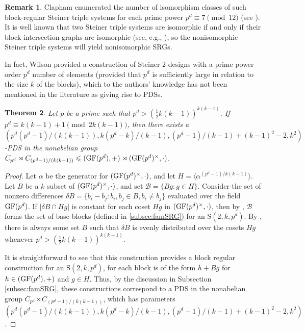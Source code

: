 \documentclass[12pt]{amsproc} %
\newtheorem{thm}{Theorem}[section]
\theoremstyle{definition}\newtheorem{defn}[thm]{Definition}
\theoremstyle{definition}\newtheorem{rem}[thm]{Remark}
\theoremstyle{definition}\newtheorem{ex}[thm]{Example}
\newcommand{\GF}{{\rm GF}}
\renewcommand\le{\leqslant}
\renewcommand{\S}{{\mathrm S}}
\begin{document}
\begin{rem}
 Clapham enumerated the number of isomorphism classes of such block-regular Steiner triple systems for each prime power $p^d \equiv 7 \pmod {12}$ (see \cite[Theorem 4.7]{clapham}). It is well known that two Steiner triple systems are isomorphic if and only if their block-intersection graphs are isomorphic (see, e.g., \cite{Colbourn_Rosa_1999, Pike_1999}), so the nonisomorphic Steiner triple systems will yield nonisomorphic SRGs.
\end{rem}

In fact, Wilson \cite{wilson} provided a construction of Steiner 2-designs with a prime power order $p^d$ number of elements (provided that $p^d$ is sufficiently large in relation to the size $k$ of the blocks), which to the authors' knowledge has not been mentioned in the literature as giving rise to PDSs.

\begin{thm}\label{WilsonBuratti-PDS-family}
Let $p$ be a prime such that $p^d > (\frac12k(k-1))^{k(k-1)}$. If $p^d \equiv k(k-1) + 1 \pmod{2k(k-1)}$, then there exists a $(p^d(p^d - 1)/(k(k-1)), k(p^d-k)/(k-1), (p^d -1)/(k-1) + (k-1)^2 -2, k^2)$-PDS in the nonabelian group $C_{p^d} \rtimes C_{(p^d-1)/(k(k-1))} \le (\GF(p^d), +) \rtimes (\GF(p^d)^\times, \cdot)$.
\end{thm}
	\begin{proof}
	Let $\alpha$ be the generator for $(\GF(p^d)^\times, \cdot)$, and let $H = \langle \alpha^{(p^d-1)/k(k-1)} \rangle$. Let $B$ be a $k$ subset of $(\GF(p^d)^\times, \cdot)$, and set $\mathscr{B} = \{ Bg : g \in H\}$. Consider the set of nonzero differences $\delta B = \{b_i - b_j : b_i, b_j \in B, b_i \neq b_j\}$ evaluated over the field $\GF(p^d)$. If $|\delta B \cap Hg|$ is constant for each coset $Hg$ in $(\GF(p^d)^\times, \cdot)$, then by \cite[Theorem 2]{wilson}, $\mathscr{B}$ forms the set of base blocks (defined in \ref{subsec:famSRG}) for an $\S(2, k, p^d)$. By \cite[Corollary 1]{wilson}, there is always some set $B$ such that $\delta B$ is evenly distributed over the cosets $Hg$ whenever $p^d > (\frac12k(k-1))^{k(k-1)}$.
	
	It is straightforward to see that this construction provides a block regular construction for an $\S(2, k, p^d)$, for each block is of the form $h + Bg$ for $h \in (\GF(p^d), +)$ and $g \in H$. Thus, by the discussion in Subsection \ref{subsec:famSRG}, these constructions correspond to a PDS in the nonabelian group $C_{p^d} \rtimes C_{(p^d-1)/(k(k-1))}$, which has parameters $(p^d(p^d - 1)/(k(k-1)), k(p^d-k)/(k-1), (p^d -1)/(k-1) + (k-1)^2 -2, k^2)$.
	\end{proof}
\end{document}
